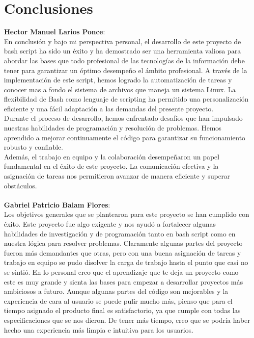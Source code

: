 \documentclass[titlepage]{article}
\begin{document}
\section{Conclusiones}
\textbf{Hector Manuel Larios Ponce}:\\En conclusión y bajo mi perspectiva personal, el desarrollo de este proyecto de bash script ha sido un éxito y ha demostrado ser una herramienta valiosa para abordar las bases que todo profesional de las tecnologías de la información debe tener para garantizar un óptimo desempeño el ámbito profesional. A través de la implementación de este script, hemos logrado la automatización de tareas y conocer mas a fondo el sistema de archivos que maneja un sistema Linux. La flexibilidad de Bash como lenguaje de scripting ha permitido una personalización eficiente y una fácil adaptación a las demandas del presente proyecto.\\Durante el proceso de desarrollo, hemos enfrentado desafíos que han impulsado nuestras habilidades de programación y resolución de problemas. Hemos aprendido a mejorar continuamente el código para garantizar su funcionamiento robusto y confiable.\\Además, el trabajo en equipo y la colaboración desempeñaron un papel fundamental en el éxito de este proyecto. La comunicación efectiva y la asignación de tareas nos permitieron avanzar de manera eficiente y superar obstáculos.
\\\\

\textbf{Gabriel Patricio Balam Flores}:\\Los objetivos generales que se plantearon para este proyecto se han cumplido con éxito. Este proyecto fue algo exigente y nos ayudó a fortalecer algunas habilidades de investigación y de programación tanto en bash script como en nuestra lógica para resolver problemas. Claramente algunas partes del proyecto fueron más demandantes que otras, pero con una buena asignación de tareas y trabajo en equipo se pudo disolver la carga de trabajo hasta el punto que casi no se sintió.
En lo personal creo que el aprendizaje que te deja un proyecto como este es muy grande y sienta las bases para empezar a desarrollar proyectos más ambiciosos a futuro. Aunque algunas partes del código son mejorables y la experiencia de cara al usuario se puede pulir mucho más, pienso que para el tiempo asignado el producto final es satisfactorio, ya que cumple con todas las especificaciones que se nos dieron. De tener más tiempo, creo que se podría haber hecho una experiencia más limpia e intuitiva para los usuarios.
\end{document}
